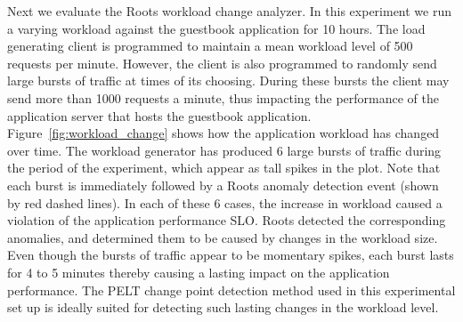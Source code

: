 Next we evaluate the Roots workload change analyzer. In this experiment we run a varying workload
against the guestbook application for 10 hours. The load generating client is programmed
to maintain a mean workload level of 500 requests per minute. However, the client
is also programmed to randomly send large bursts of traffic at times of its choosing. During these bursts 
the client may send more than 1000 requests a minute, thus impacting the performance of
the application server that hosts the guestbook application. Figure~\ref{fig:workload_change} shows how
the application workload has changed over time. The workload generator has produced 6 large bursts of traffic during the 
period of the experiment, which appear as tall spikes in the plot.
Note that each burst is immediately followed by a Roots anomaly detection event (shown by red dashed lines). 
In each of these 6 cases, the increase in workload caused a violation of the application performance SLO.
Roots detected the corresponding anomalies, and determined them to be caused by changes in the workload size.
Even though the bursts of traffic appear to be momentary
spikes, each burst lasts for 4 to 5 minutes thereby causing a lasting impact on the application performance.
The PELT change point detection method used in this experimental set up is ideally suited for detecting
such lasting changes in the workload level.
